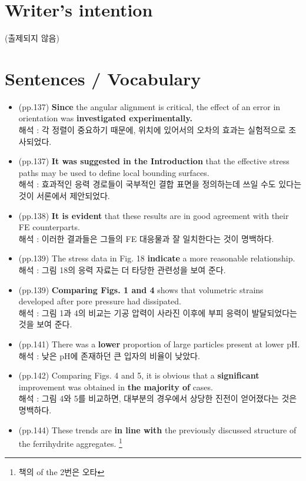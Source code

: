 \documentclass[10pt]{report}
\begin{document}
	\section{Writer's intention}
	(출제되지 않음)
	
	\section{Sentences / Vocabulary}
	\begin{itemize}
		\item (pp.137) {\bf Since} the angular alignment is critical, the effect of an error in orientation was {\bf investigated experimentally.} \\
		해석 : 각 정렬이 중요하기 때문에, 위치에 있어서의 오차의 효과는 실험적으로 조사되었다.
		\item (pp.137) {\bf It was suggested in the Introduction } that the effective stress paths may be used to define local bounding surfaces. \\
		해석 : 효과적인 응력 경로들이 국부적인 결합 표면을 정의하는데 쓰일 수도 있다는 것이 서론에서 제안되었다.
		\item (pp.138) {\bf It is evident} that these results are in good agreement with their FE counterparts. \\
		해석 : 이러한 결과들은 그들의 FE 대응물과 잘 일치한다는 것이 명백하다.
		\item (pp.139) The stress data in Fig. 18 {\bf indicate} a more reasonable relationship. \\
		해석 : 그림 18의 응력 자료는 더 타당한 관련성을 보여 준다.
		\item (pp.139) {\bf Comparing Figs. 1 and 4} shows that volumetric strains developed after pore pressure had dissipated. \\
		해석 : 그림 1과 4의 비교는 기공 압력이 사라진 이후에 부피 응력이 발달되었다는 것을 보여 준다.
		\item (pp.141) There was a {\bf lower} proportion of large particles present at lower pH. \\
		해석 : 낮은 pH에 존재하던 큰 입자의 비율이 낮았다.
		\item (pp.142) Comparing Figs. 4 and 5, it is obvious that a {\bf significant} improvement was obtained in {\bf the majority of} cases. \\
		해석 : 그림 4와 5를 비교하면, 대부분의 경우에서 상당한 진전이 얻어졌다는 것은 명백하다.
		\item (pp.144) These trends are {\bf in line with} the previously discussed structure of the ferrihydrite aggregates. \footnote{책의 of the 2번은 오타} \\

\end{itemize}
\end{document}
